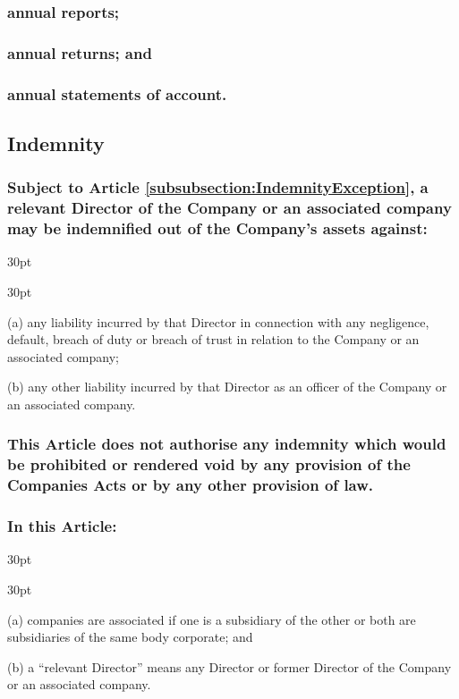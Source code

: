 \documentclass[12pt]{article}
\def\clauseindent{30pt}
\newenvironment{subindentlist}{\begin{adjustwidth}{\clauseindent}{}\begin{labeledlist}{\clauseindent}}{\end{labeledlist}\end{adjustwidth}}
\begin{document}
\subsubsection{annual reports;}
\subsubsection{annual returns; and}
\subsubsection{annual statements of account.}

\subsection{Indemnity}
\subsubsection{Subject to Article \ref{subsubsection:IndemnityException}, a relevant Director of the Company or an associated company may be indemnified out of the Company’s assets against:}
\begin{subindentlist}
    \item [(a)] any liability incurred by that Director in connection with any negligence, default, breach of duty or breach of trust in relation to the Company or an associated company;
    \item [(b)] any other liability incurred by that Director as an officer of the Company or an associated company.
\end{subindentlist}
\subsubsection{\label{subsubsection:IndemnityException}This Article does not authorise any indemnity which would be prohibited or rendered void by any provision of the Companies Acts or by any other provision of law.}
\subsubsection{In this Article:}
\begin{subindentlist}
    \item [(a)] companies are associated if one is a subsidiary of the other or both are subsidiaries of the same body corporate; and
    \item [(b)] a “relevant Director” means any Director or former Director of the Company or an associated company.
\end{subindentlist}
\end{document}
